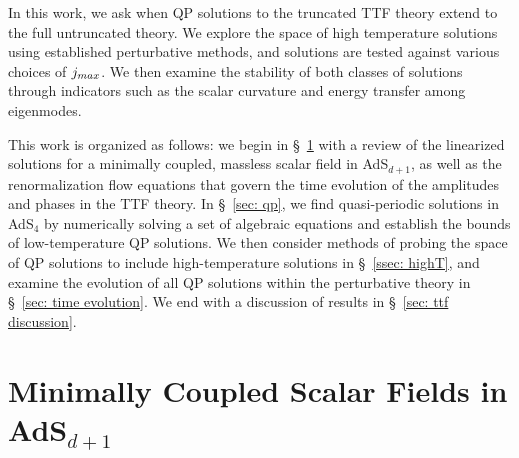 \documentclass[../PhD.tex]{subfiles}
\begin{document}
In this work, we ask when QP solutions to the truncated TTF theory extend to the full untruncated theory. We explore the space of high temperature solutions using established perturbative methods, and solutions are tested against various choices of $j_{max}$. We then examine the stability of both classes of solutions through indicators such as the scalar curvature and energy transfer among eigenmodes. 

This work is organized as follows: we begin in \S~\!\ref{sec: scalar in AdS} with a review of the linearized solutions for a minimally coupled, massless scalar field in AdS$_{d+1}$, as well as the renormalization flow equations that govern the time evolution of the amplitudes and phases in the TTF theory. In \S~\!\ref{sec: qp}, we find quasi-periodic solutions in AdS$_4$ by numerically solving a set of algebraic equations and establish the bounds of low-temperature QP solutions. We then consider methods of probing the space of QP solutions to include high-temperature solutions in \S\!~\ref{ssec: highT}, and examine the evolution of all QP solutions within the perturbative theory in \S\!~\ref{sec: time evolution}. We end with a discussion of results in \S~\!\ref{sec: ttf discussion}. 


\section{Minimally Coupled Scalar Fields in AdS$_{d+1}$}
\label{sec: scalar in AdS}
\end{document}
